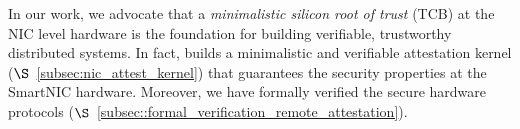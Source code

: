 In our work, we advocate that a {\em minimalistic silicon root of trust} (TCB) at the NIC level hardware is the foundation for building verifiable, trustworthy distributed systems. 
In fact, \projecttitle{} builds a minimalistic and verifiable attestation kernel ($\S$~\ref{subsec:nic_attest_kernel}) that guarantees the \projecttitle{} security properties at the SmartNIC hardware. 
Moreover, we have formally verified the \projecttitle{} secure hardware protocols ($\S$~\ref{subsec::formal_verification_remote_attestation}).




